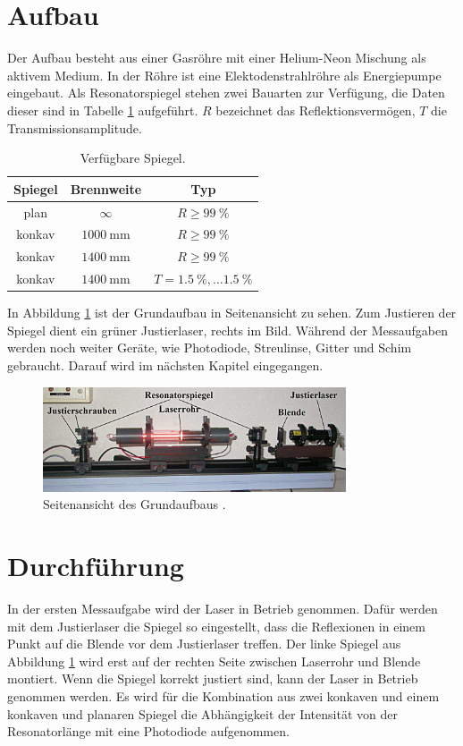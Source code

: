 \section{Aufbau}
\label{sec:Aufbau}
Der Aufbau besteht aus einer Gasröhre mit einer Helium-Neon Mischung als aktivem Medium.
In der Röhre ist eine Elektodenstrahlröhre als Energiepumpe eingebaut.
Als Resonatorspiegel stehen zwei Bauarten zur Verfügung,
die Daten dieser sind in Tabelle \ref{tab:aufbau-spiegel} aufgeführt.
$R$ bezeichnet das Reflektionsvermögen, $T$ die Transmissionsamplitude.

\begin{table}
  \centering
  \caption{Verfügbare Spiegel.}
  \label{tab:aufbau-spiegel}
  \begin{tabular}{c c c}
    \toprule
    {Spiegel} & {Brennweite} & {Typ} \\
    \midrule
    plan & $\infty$ & $R \geq \SI{99}{\percent}$ \\
    konkav & $\SI{1000}{\milli\meter}$ & $R \geq \SI{99}{\percent}$ \\
    konkav & $\SI{1400}{\milli\meter}$ & $R \geq \SI{99}{\percent}$ \\
    konkav & $\SI{1400}{\milli\meter}$ & $T = \SI{1.5}{\percent}, \ldots \SI{1.5}{\percent}$ \\
    \bottomrule
  \end{tabular}
\end{table}

In Abbildung \ref{fig:aufbau} ist der Grundaufbau in Seitenansicht zu sehen.
Zum Justieren der Spiegel dient ein grüner Justierlaser, rechts im Bild.
Während der Messaufgaben werden noch weiter Geräte, wie Photodiode, Streulinse, Gitter und
Schim gebraucht.
Darauf wird im nächsten Kapitel eingegangen.

\begin{figure}
  \centering
  \includegraphics[width=0.8\textwidth]{images/aufbau.png}
  \caption{Seitenansicht des Grundaufbaus \cite{anleitung}.}
  \label{fig:aufbau}
\end{figure}


\section{Durchführung}
\label{sec:durchfuehrung}
In der ersten Messaufgabe wird der Laser in Betrieb genommen.
Dafür werden mit dem Justierlaser die Spiegel so eingestellt,
dass die Reflexionen in einem Punkt auf die Blende vor dem Justierlaser treffen.
Der linke Spiegel aus Abbildung \ref{fig:aufbau} wird erst auf der rechten Seite zwischen Laserrohr und Blende montiert.
Wenn die Spiegel korrekt justiert sind, kann der Laser in Betrieb genommen werden.
Es wird für die Kombination aus zwei konkaven und einem konkaven und planaren Spiegel die
Abhängigkeit der Intensität von der Resonatorlänge mit eine Photodiode aufgenommen.

